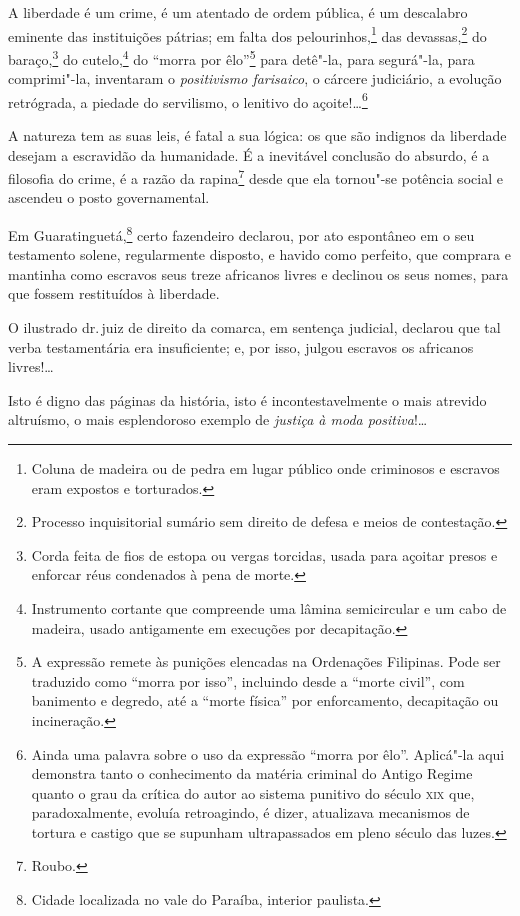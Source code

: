 A liberdade é um crime, é um atentado de ordem pública, é um descalabro
eminente das instituições pátrias; em falta dos pelourinhos,\footnote{
  Coluna de madeira ou de pedra em lugar público onde criminosos e
  escravos eram expostos e torturados.} das devassas,\footnote{
  Processo inquisitorial sumário sem direito de defesa e meios de
  contestação.} do baraço,\footnote{Corda feita de fios de estopa ou
  vergas torcidas, usada para açoitar presos e enforcar réus condenados
  à pena de morte.} do cutelo,\footnote{Instrumento cortante que
  compreende uma lâmina semicircular e um cabo de madeira, usado
  antigamente em execuções por decapitação.} do ``morra por
êlo''\footnote{A expressão remete às punições elencadas na Ordenações
  Filipinas. Pode ser traduzido como ``morra por isso'', incluindo desde a
  ``morte civil'', com banimento e degredo, até a ``morte física'' por
  enforcamento, decapitação ou incineração.} para detê"-la, para
segurá"-la, para comprimi"-la, inventaram o \emph{positivismo farisaico},
o cárcere judiciário, a evolução retrógrada, a piedade do servilismo, o
lenitivo do açoite!\ldots{}\footnote{Ainda uma palavra sobre o uso
  da expressão ``morra por êlo''. Aplicá"-la aqui demonstra tanto o
  conhecimento da matéria criminal do Antigo Regime quanto o grau da
  crítica do autor ao sistema punitivo do século \textsc{xix} que,
  paradoxalmente, evoluía retroagindo, é dizer, atualizava mecanismos de
  tortura e castigo que se supunham ultrapassados em pleno século das
  luzes.}

A natureza tem as suas leis, é fatal a sua lógica: os que são indignos
da liberdade desejam a escravidão da humanidade. É a inevitável
conclusão do absurdo, é a filosofia do crime, é a razão da
rapina\footnote{Roubo.} desde que ela tornou"-se potência social e
ascendeu o posto governamental.

Em Guaratinguetá,\footnote{Cidade localizada no vale do Paraíba,
  interior paulista.} certo fazendeiro declarou, por ato espontâneo em
o seu testamento solene, regularmente disposto, e havido como perfeito,
que comprara e mantinha como escravos seus treze africanos livres e
declinou os seus nomes, para que fossem restituídos à liberdade.

O ilustrado dr.\,juiz de direito da comarca, em sentença judicial,
declarou que tal verba testamentária era insuficiente; e, por isso,
julgou escravos os africanos livres!\ldots{}

Isto é digno das páginas da história, isto é incontestavelmente o mais
atrevido altruísmo, o mais esplendoroso exemplo de \emph{justiça à moda
positiva}!\ldots{}

